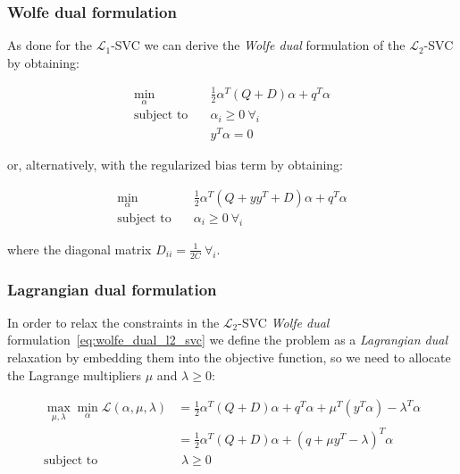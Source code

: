 \subsubsection{Wolfe dual formulation}

As done for the $\mathcal{L}_1$-SVC we can derive the \emph{Wolfe dual} formulation of the $\mathcal{L}_2$-SVC by obtaining:

\begin{equation} \label{eq:wolfe_dual_l2_svc}
    \begin{aligned}
        \min_{\alpha} \quad & \frac{1}{2}\alpha^T (Q + D)\alpha+q^T\alpha \\
            \text{subject to} \quad & \alpha_i\geq 0 \ \forall_i \\ & y^T\alpha=0
    \end{aligned}
\end{equation}

or, alternatively, with the regularized bias term by obtaining:

\begin{equation} \label{eq:reg_bias_wolfe_dual_l2_svc}
    \begin{aligned}
        \min_{\alpha} \quad & \frac{1}{2}\alpha^T (Q + yy^T + D) \alpha + q^T \alpha \\
            \text{subject to} \quad & \alpha_i \geq 0 \ \forall_i
    \end{aligned}
\end{equation}

where the diagonal matrix $\displaystyle D_{ii} = \frac{1}{2C} \ \forall_i$.

\subsubsection{Lagrangian dual formulation}

In order to relax the constraints in the $\mathcal{L}_2$-SVC \emph{Wolfe dual} formulation~\eqref{eq:wolfe_dual_l2_svc} we define the problem as a \emph{Lagrangian dual} relaxation by embedding them into the objective function, so we need to allocate the Lagrange multipliers $\mu$ and $\lambda \geq 0$:

\begin{equation} \label{eq:l2_svc_lagrangian_dual}
	\begin{aligned}
		    \max_{\mu,\lambda} \min_{\alpha} \mathcal{L}(\alpha,\mu,\lambda) &= \frac{1}{2} \alpha^T (Q+D)\alpha+q^T\alpha + \mu^T (y^T \alpha) - \lambda^T \alpha \\
    &= \frac{1}{2} \alpha^T (Q+D)\alpha + (q + \mu y^T - \lambda)^T \alpha \\
    \text{subject to} \quad & \,\, \lambda \geq 0
	\end{aligned}
\end{equation}

